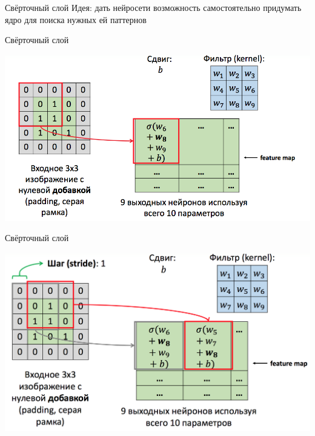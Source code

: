 \documentclass[notes,12pt, aspectratio=169]{beamer}
\begin{document}
\begin{frame}{Свёрточный слой}
\alert{Идея:} дать нейросети возможность самостоятельно придумать ядро для поиска нужных ей паттернов
\end{frame}


\begin{frame}{Свёрточный слой}
\begin{center}
	\includegraphics[width=.8\linewidth]{conv_layer.png}
\end{center}
\end{frame}


\begin{frame}{Свёрточный слой}
\begin{center}
	\includegraphics[width=.8\linewidth]{conv_layer_2.png}
\end{center}
\end{frame}
\end{document}
